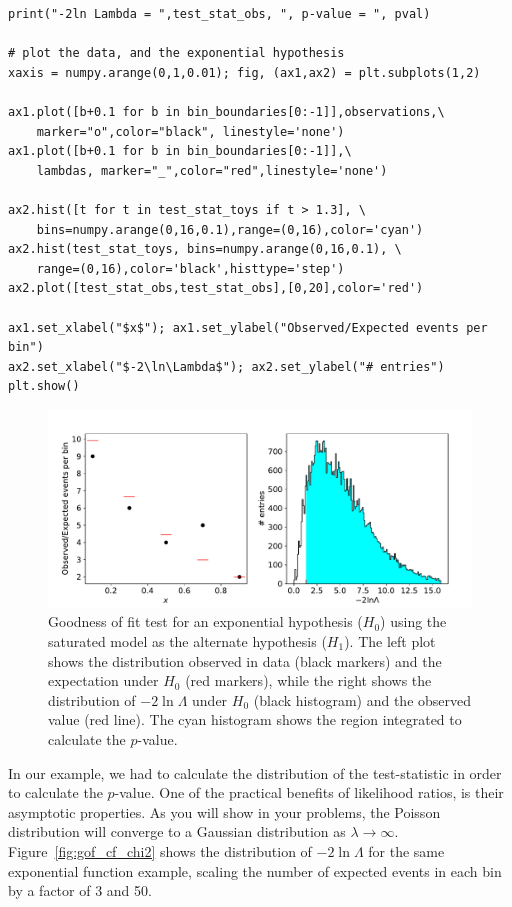 \begin{tcolorbox}[colback=backblue]
\begin{lstlisting}[style = Python]
print("-2ln Lambda = ",test_stat_obs, ", p-value = ", pval)

# plot the data, and the exponential hypothesis
xaxis = numpy.arange(0,1,0.01); fig, (ax1,ax2) = plt.subplots(1,2)

ax1.plot([b+0.1 for b in bin_boundaries[0:-1]],observations,\
    marker="o",color="black", linestyle='none')
ax1.plot([b+0.1 for b in bin_boundaries[0:-1]],\
    lambdas, marker="_",color="red",linestyle='none')

ax2.hist([t for t in test_stat_toys if t > 1.3], \
    bins=numpy.arange(0,16,0.1),range=(0,16),color='cyan')
ax2.hist(test_stat_toys, bins=numpy.arange(0,16,0.1), \
    range=(0,16),color='black',histtype='step')
ax2.plot([test_stat_obs,test_stat_obs],[0,20],color='red')

ax1.set_xlabel("$x$"); ax1.set_ylabel("Observed/Expected events per bin")
ax2.set_xlabel("$-2\ln\Lambda$"); ax2.set_ylabel("# entries")
plt.show()
\end{lstlisting}
\end{tcolorbox}

\begin{figure}
    \centering
    \includegraphics[width=\textwidth]{figures/Hypotest/gof_ex.pdf}
    \caption{Goodness of fit test for an exponential hypothesis ($H_0$) using the saturated model as the alternate hypothesis ($H_1$). The left plot shows the distribution observed in data (black markers) and the expectation under $H_0$ (red markers), while the right shows the distribution of $-2\ln\Lambda$ under $H_0$ (black histogram) and the observed value (red line). The cyan histogram shows the region integrated to calculate the $p$-value. }
    \label{fig:gof}
\end{figure}

In our example, we had to calculate the distribution of the test-statistic in order to calculate the $p$-value. One of the practical benefits of likelihood ratios, is their asymptotic properties. As you will show in your problems, the Poisson distribution will converge to a Gaussian distribution as $\lambda\rightarrow\infty$. Figure~\ref{fig:gof_cf_chi2} shows the distribution of $-2\ln\Lambda$ for the same exponential function example, scaling the number of expected events in each bin by a factor of 3 and 50. 

